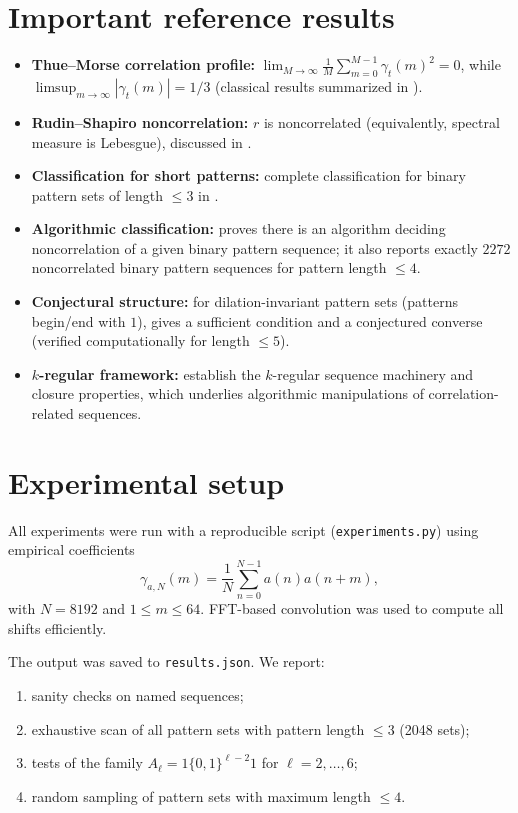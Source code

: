 \documentclass[11pt]{article}
\begin{document}
\section{Important reference results}
\begin{itemize}
  \item \textbf{Thue--Morse correlation profile:} $\lim_{M\to\infty}\frac1M\sum_{m=0}^{M-1}\gamma_t(m)^2=0$, while $\limsup_{m\to\infty}|\gamma_t(m)|=1/3$ (classical results summarized in \cite{Kon21}).
  \item \textbf{Rudin--Shapiro noncorrelation:} $r$ is noncorrelated (equivalently, spectral measure is Lebesgue), discussed in \cite{Kon21,ZPK18}.
  \item \textbf{Classification for short patterns:} complete classification for binary pattern sets of length $\le 3$ in \cite{ZPK18}.
  \item \textbf{Algorithmic classification:} \cite{Kon21} proves there is an algorithm deciding noncorrelation of a given binary pattern sequence; it also reports exactly $2272$ noncorrelated binary pattern sequences for pattern length $\le 4$.
  \item \textbf{Conjectural structure:} for dilation-invariant pattern sets (patterns begin/end with $1$), \cite{Kon21} gives a sufficient condition and a conjectured converse (verified computationally for length $\le 5$).
  \item \textbf{$k$-regular framework:} \cite{AS92,AS03b} establish the $k$-regular sequence machinery and closure properties, which underlies algorithmic manipulations of correlation-related sequences.
\end{itemize}

\section{Experimental setup}
All experiments were run with a reproducible script (\texttt{experiments.py}) using empirical coefficients
\[
\gamma_{a,N}(m)=\frac1N\sum_{n=0}^{N-1}a(n)a(n+m),
\]
with $N=8192$ and $1\le m\le 64$. FFT-based convolution was used to compute all shifts efficiently.

The output was saved to \texttt{results.json}. We report:
\begin{enumerate}
  \item sanity checks on named sequences;
  \item exhaustive scan of all pattern sets with pattern length $\le 3$ (2048 sets);
  \item tests of the family $A_\ell=1\{0,1\}^{\ell-2}1$ for $\ell=2,\dots,6$;
  \item random sampling of pattern sets with maximum length $\le 4$.
\end{enumerate}
\end{document}
